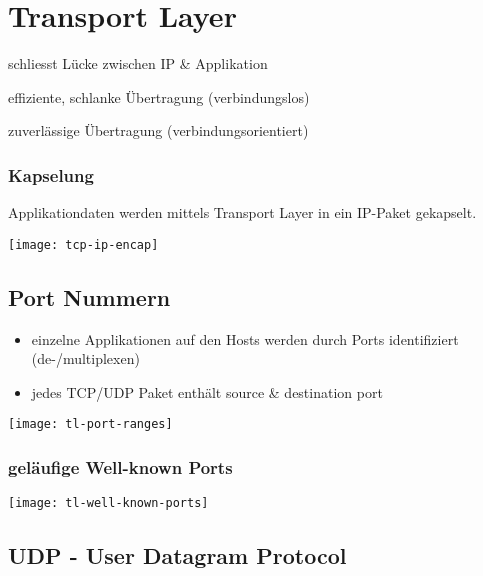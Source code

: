 \section{Transport Layer}

\begin{description}
	\item schliesst Lücke zwischen IP \& Applikation
	\item[UDP] effiziente, schlanke Übertragung (verbindungslos)
	\item[TCP] zuverlässige Übertragung (verbindungsorientiert)
\end{description}

\subsubsection{Kapselung}

Applikationdaten werden mittels Transport Layer in ein IP-Paket gekapselt.

\texttt{[image: tcp-ip-encap]}



\subsection{Port Nummern}

\begin{itemize}
	\item einzelne Applikationen auf den Hosts werden durch Ports identifiziert
	      (de-/multiplexen)
	\item jedes TCP/UDP Paket enthält source \& destination port
\end{itemize}

\begin{center}
	\texttt{[image: tl-port-ranges]}
\end{center}

\subsubsection{geläufige Well-known Ports}

\begin{center}
	\texttt{[image: tl-well-known-ports]}
\end{center}



\subsection{UDP - User Datagram Protocol}

